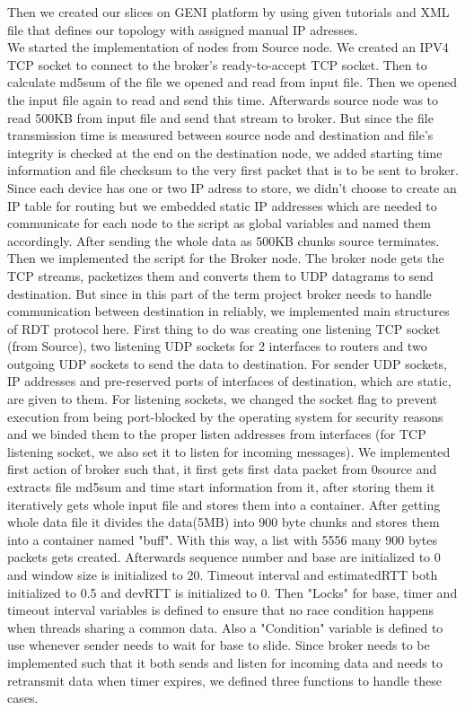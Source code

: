 \documentclass[conference]{IEEEtran}
\begin{document}
Then we created our slices on GENI platform by using given tutorials and XML file that defines our topology with assigned manual IP adresses. \\

We started the implementation of nodes from Source node. We created an IPV4 TCP socket to connect to the broker's ready-to-accept TCP socket. Then to calculate md5sum of the file we opened and read from input file. Then we opened the input file again to read and send this time. Afterwards source node was to read 500KB from input file and send that stream to broker. But since the file transmission time is measured between source node and destination and file's integrity is checked at the end on the destination node, we added starting time information and file checksum to the very first packet that is to be sent to broker. Since each device has one or two IP adress to store, we didn't choose to create an IP table for routing but we embedded static IP addresses which are needed to communicate for each node to the script as global variables and named them accordingly. After sending the whole data as 500KB chunks source terminates. \\

Then we implemented the script for the Broker node. The broker node gets the TCP streams, packetizes them and converts them to UDP datagrams to send destination. But since in this part of the term project broker needs to handle communication between destination in reliably, we implemented main structures of RDT protocol here. First thing to do was creating one listening TCP socket (from Source), two listening UDP sockets for 2 interfaces to routers and two outgoing UDP sockets to send the data to destination. For sender UDP sockets, IP addresses and pre-reserved ports of interfaces of destination, which are static, are given to them. For listening sockets, we changed the socket flag to prevent execution from being port-blocked by the operating system for security reasons and we binded them to the proper listen addresses from interfaces (for TCP listening socket, we also set it to listen for incoming messages). We implemented first action of broker such that, it first gets first data packet from 0source and extracts file md5sum and time start information from it, after storing them it iteratively gets whole input file and stores them into a container. After getting whole data file it divides the data(5MB) into 900 byte chunks and stores them into a container named "buff". With this way, a list with 5556 many 900 bytes packets gets created. Afterwards sequence number and base are initialized to 0 and window size is initialized to 20. Timeout interval and estimatedRTT both initialized to 0.5 and devRTT is initialized to 0. Then "Locks" for base, timer and timeout interval variables is defined to ensure that no race condition happens when threads sharing a common data. Also a "Condition" variable is defined to use whenever sender needs to wait for base to slide. Since broker needs to be implemented such that it both sends and listen for incoming data and needs to retransmit data when timer expires, we defined three functions to handle these cases. \\
\end{document}
